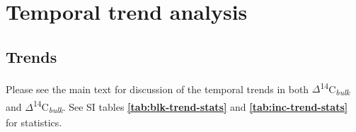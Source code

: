 \documentclass[english,man,floatsintext]{apa6}
\begin{document}
\hypertarget{temporal-trend-analysis}{%
\section{Temporal trend analysis}\label{temporal-trend-analysis}}

\hypertarget{trends}{%
\subsection{Trends}\label{trends}}

Please see the main text for discussion of the temporal trends in both \(\Delta\)\textsuperscript{14}C\textsubscript{\emph{bulk}} and \(\Delta\)\textsuperscript{14}C\textsubscript{\emph{bulk}}. See SI tables \textbf{\ref{tab:blk-trend-stats}} and \textbf{\ref{tab:inc-trend-stats}} for statistics.



\begingroup\fontsize{10}{12}\selectfont
\end{document}
